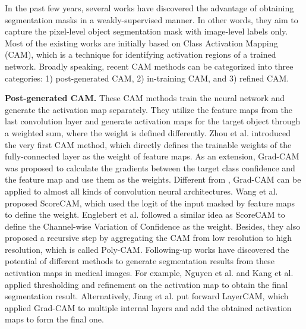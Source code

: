 


In the past few years, several works have discovered the advantage of obtaining segmentation masks in a weakly-supervised manner. In other words, they aim to capture the pixel-level object segmentation mask with image-level labels only. Most of the existing works are initially based on Class Activation Mapping (CAM), which is a technique for identifying activation regions of a trained network. Broadly speaking, recent CAM methods can be categorized into three categories: 1) post-generated CAM, 2) in-training CAM, and 3) refined CAM.


\textbf{Post-generated CAM.} These CAM methods \cite{zhou2016learning,selvaraju2017grad,omeiza2019smooth,wang2020score,ramaswamy2020ablation,jiang2021layercam} train the neural network and generate the activation map separately. They utilize the feature maps from the last convolution layer and generate activation maps for the target object through a weighted sum, where the weight is defined differently. Zhou et al. \cite{zhou2016learning} introduced the very first CAM method, which directly defines the trainable weights of the fully-connected layer as the weight of feature maps. As an extension, Grad-CAM \cite{selvaraju2017grad} was proposed to calculate the gradients between the target class confidence and the feature map and use them as the weights. Different from \cite{selvaraju2017grad}, Grad-CAM can be applied to almost all kinds of convolution neural architectures. Wang et al. \cite{wang2020score} proposed ScoreCAM, which used the logit of the input masked by feature maps to define the weight. Englebert et al. \cite{englebert2022poly} followed a similar idea as ScoreCAM to define the Channel-wise Variation of Confidence as the weight. Besides, they also proposed a recursive step by aggregating the CAM from low resolution to high resolution, which is called Poly-CAM.
Following-up works have discovered the potential of different methods to generate segmentation results from these activation maps in medical images. For example, Nguyen et al. \cite{nguyen2019novel} and Kang et al. \cite{kang2021towards} applied thresholding and refinement on the activation map to obtain the final segmentation result. Alternatively, Jiang et al. \cite{jiang2021layercam} put forward LayerCAM, which applied Grad-CAM to multiple internal layers and add the obtained activation maps to form the final one. 

